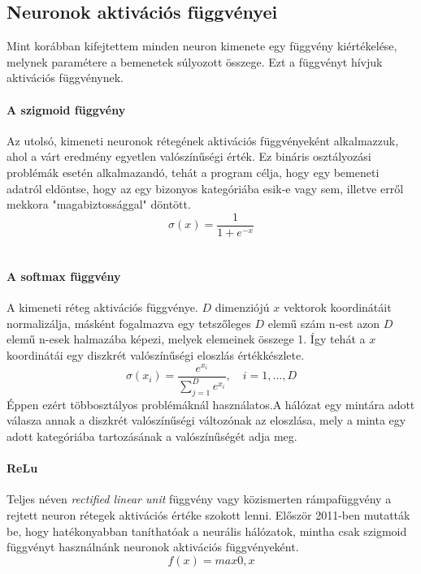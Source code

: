 \subsection{Neuronok aktivációs függvényei}
Mint korábban kifejtettem minden neuron kimenete egy függvény kiértékelése, melynek paramétere a bemenetek súlyozott összege. Ezt a függvényt hívjuk aktivációs függvénynek. 

\paragraph{A szigmoid függvény}
Az utolsó, kimeneti neuronok rétegének aktivációs függvényeként alkalmazzuk, ahol a várt eredmény egyetlen valószínűségi érték. Ez bináris osztályozási problémák esetén alkalmazandó, tehát a program célja, hogy egy bemeneti adatról eldöntse, hogy az egy bizonyos kategóriába esik-e vagy sem, illetve erről mekkora "magabiztossággal" döntött.
\begin{equation}
	\sigma(x)= \frac{1}{1+e^{-x}}
	\label{eq:sigmoid}
\end{equation}\

\paragraph{A softmax függvény}
A kimeneti réteg aktivációs függvénye. $D$ dimenziójú $x$ vektorok koordinátáit normalizálja, másként fogalmazva egy tetszőleges $D$ elemű szám n-est azon $D$ elemű n-esek halmazába képezi, melyek elemeinek összege 1. Így tehát a $x$ koordinátái egy diszkrét valószínűségi eloszlás értékkészlete. 
\begin{equation}
\sigma(x_i)=\frac{e^{x_i}}{\sum_{j=1}^{D}e^{x_i}},\quad i = 1,\dots,D
\label{eq:softmax}
\end{equation}
Éppen ezért többosztályos problémáknál használatos.A hálózat egy mintára adott válasza annak a diszkrét valószínűségi változónak az eloszlása, mely a minta egy adott kategóriába tartozásának a valószínűségét adja meg.

\paragraph{ReLu}
Teljes néven \emph{rectified linear unit} függvény vagy közismerten rámpafüggvény a rejtett neuron rétegek aktivációs értéke szokott lenni. Először 2011-ben mutatták be, hogy hatékonyabban taníthatóak a neurális hálózatok, mintha csak szigmoid függvényt használnánk neuronok aktivációs függvényeként.\cite{wiki:relu}
\begin{equation}
	f(x) = max{0,x}
	\label{eq:relu}
\end{equation}

